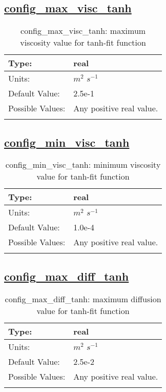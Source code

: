 \subsection[config\_max\_visc\_tanh]{\hyperref[sec:nm_tab_vmix_tanh]{config\_max\_visc\_tanh}}
\label{subsec:nm_sec_config_max_visc_tanh}
\begin{center}
\begin{longtable}{| p{2.0in} | p{4.0in} |}
    \hline
    Type: & real \\
    \hline
    Units: & $m^2$ $s^{-1}$ \\
    \hline
    Default Value: & 2.5e-1 \\
    \hline
    Possible Values: & Any positive real value. \\
    \hline
    \caption{config\_max\_visc\_tanh: maximum viscosity value for tanh-fit function}
\end{longtable}
\end{center}
\subsection[config\_min\_visc\_tanh]{\hyperref[sec:nm_tab_vmix_tanh]{config\_min\_visc\_tanh}}
\label{subsec:nm_sec_config_min_visc_tanh}
\begin{center}
\begin{longtable}{| p{2.0in} | p{4.0in} |}
    \hline
    Type: & real \\
    \hline
    Units: & $m^2$ $s^{-1}$ \\
    \hline
    Default Value: & 1.0e-4 \\
    \hline
    Possible Values: & Any positive real value. \\
    \hline
    \caption{config\_min\_visc\_tanh: minimum viscosity value for tanh-fit function}
\end{longtable}
\end{center}
\subsection[config\_max\_diff\_tanh]{\hyperref[sec:nm_tab_vmix_tanh]{config\_max\_diff\_tanh}}
\label{subsec:nm_sec_config_max_diff_tanh}
\begin{center}
\begin{longtable}{| p{2.0in} | p{4.0in} |}
    \hline
    Type: & real \\
    \hline
    Units: & $m^2$ $s^{-1}$ \\
    \hline
    Default Value: & 2.5e-2 \\
    \hline
    Possible Values: & Any positive real value. \\
    \hline
    \caption{config\_max\_diff\_tanh: maximum diffusion value for tanh-fit function}
\end{longtable}
\end{center}
